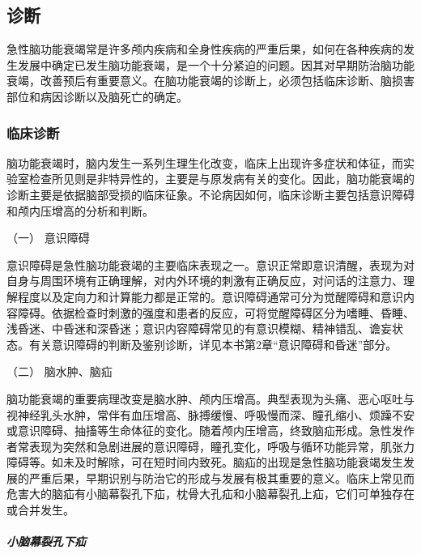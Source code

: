 \subsection{诊断}

急性脑功能衰竭常是许多颅内疾病和全身性疾病的严重后果，如何在各种疾病的发生发展中确定已发生脑功能衰竭，是一个十分紧迫的问题。因其对早期防治脑功能衰竭，改善预后有重要意义。在脑功能衰竭的诊断上，必须包括临床诊断、脑损害部位和病因诊断以及脑死亡的确定。

\subsubsection{临床诊断}

脑功能衰竭时，脑内发生一系列生理生化改变，临床上出现许多症状和体征，而实验室检查所见则是非特异性的，主要是与原发病有关的变化。因此，脑功能衰竭的诊断主要是依据脑部受损的临床征象。不论病因如何，临床诊断主要包括意识障碍和颅内压增高的分析和判断。

\hypertarget{text00067.htmlux5cux23CHP3-1-2-1-1}{}
（一） 意识障碍

意识障碍是急性脑功能衰竭的主要临床表现之一。意识正常即意识清醒，表现为对自身与周围环境有正确理解，对内外环境的刺激有正确反应，对问话的注意力、理解程度以及定向力和计算能力都是正常的。意识障碍通常可分为觉醒障碍和意识内容障碍。依据检查时刺激的强度和患者的反应，可将觉醒障碍区分为嗜睡、昏睡、浅昏迷、中昏迷和深昏迷；意识内容障碍常见的有意识模糊、精神错乱、谵妄状态。有关意识障碍的判断及鉴别诊断，详见本书第2章“意识障碍和昏迷”部分。

\hypertarget{text00067.htmlux5cux23CHP3-1-2-1-2}{}
（二） 脑水肿、脑疝

脑功能衰竭的重要病理改变是脑水肿、颅内压增高。典型表现为头痛、恶心呕吐与视神经乳头水肿，常伴有血压增高、脉搏缓慢、呼吸慢而深、瞳孔缩小、烦躁不安或意识障碍、抽搐等生命体征的变化。随着颅内压增高，终致脑疝形成。急性发作者常表现为突然和急剧进展的意识障碍，瞳孔变化，呼吸与循环功能异常，肌张力障碍等。如未及时解除，可在短时间内致死。脑疝的出现是急性脑功能衰竭发生发展的严重后果，早期识别与防治它的形成与发展有极其重要的意义。临床上常见而危害大的脑疝有小脑幕裂孔下疝，枕骨大孔疝和小脑幕裂孔上疝，它们可单独存在或合并发生。

\subparagraph{小脑幕裂孔下疝}

